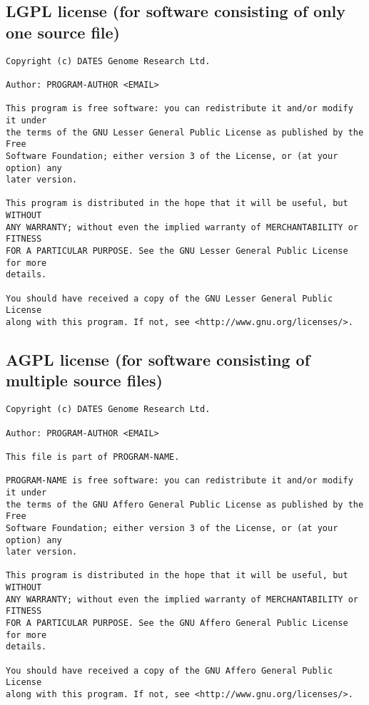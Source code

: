 \documentclass[10pt,a4paper]{article}
\begin{document}
\subsection{LGPL license (for software consisting of only one source file)}
\begin{boilerplate}
\begin{verbatim}
Copyright (c) DATES Genome Research Ltd. 

Author: PROGRAM-AUTHOR <EMAIL> 

This program is free software: you can redistribute it and/or modify it under 
the terms of the GNU Lesser General Public License as published by the Free 
Software Foundation; either version 3 of the License, or (at your option) any 
later version. 

This program is distributed in the hope that it will be useful, but WITHOUT 
ANY WARRANTY; without even the implied warranty of MERCHANTABILITY or FITNESS 
FOR A PARTICULAR PURPOSE. See the GNU Lesser General Public License for more 
details. 

You should have received a copy of the GNU Lesser General Public License 
along with this program. If not, see <http://www.gnu.org/licenses/>. 
\end{verbatim}
\end{boilerplate}

\subsection{AGPL license (for software consisting of multiple source files)}
\begin{boilerplate}
\begin{verbatim}
Copyright (c) DATES Genome Research Ltd. 

Author: PROGRAM-AUTHOR <EMAIL> 

This file is part of PROGRAM-NAME. 

PROGRAM-NAME is free software: you can redistribute it and/or modify it under 
the terms of the GNU Affero General Public License as published by the Free 
Software Foundation; either version 3 of the License, or (at your option) any 
later version. 

This program is distributed in the hope that it will be useful, but WITHOUT 
ANY WARRANTY; without even the implied warranty of MERCHANTABILITY or FITNESS 
FOR A PARTICULAR PURPOSE. See the GNU Affero General Public License for more 
details. 

You should have received a copy of the GNU Affero General Public License 
along with this program. If not, see <http://www.gnu.org/licenses/>.
\end{verbatim}
\end{boilerplate}
\end{document}
